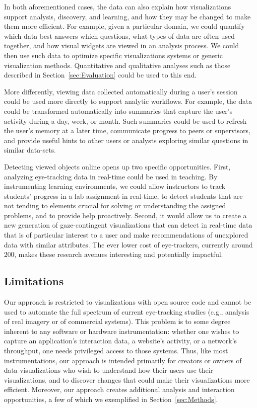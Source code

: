 In both aforementioned cases, the data can also explain how visualizations support analysis, discovery, and learning, and how they may be changed to make them more efficient. For example, given a particular domain, we could quantify which data best answers which questions, what types of data are often used together, and how visual widgets are viewed in an analysis process. We could then use such data to optimize specific visualizations systems or generic visualization methods.  Quantitative and qualitative analyses such as those described in Section~\ref{sec:Evaluation} could be used to this end.  

More differently, viewing data collected automatically during a user's session could be used more directly to support analytic workflows. For example, the data could be transformed automatically into summaries that capture the user's activity during a day, week, or month. Such summaries could be used to refresh the user's memory at a later time, communicate progress to peers or supervisors, and provide useful hints to other users or analysts exploring similar questions in similar data-sets.

Detecting viewed objects online opens up two specific opportunities. First, analyzing eye-tracking data in real-time could be used in teaching. By instrumenting learning environments, we could allow instructors to track students' progress in a lab assignment in real-time, to detect students that are not tending to elements crucial for solving or understanding the assigned problems, and to provide help proactively. Second, it would allow us to create a new generation of gaze-contingent visualizations that can detect in real-time data that is of particular interest to a user and make recommendations of unexplored data with similar attributes. The ever lower cost of eye-trackers, currently around $200$, makes these research avenues interesting and potentially impactful. 


\subsection{Limitations}
\label{sec:Limitations}
Our approach is restricted to visualizations with open source code and cannot be used to automate the full spectrum of current eye-tracking studies (e.g., analysis of real imagery or of commercial systems).   This problem is to some degree inherent to any software or hardware instrumentation: whether one wishes to capture an application's interaction data, a website's activity, or a network's throughput, one needs privileged access to those systems. Thus, like most instrumentations, our approach is intended primarily for creators or owners of data visualizations who wish to understand how their users use their visualizations, and to discover changes that could make their visualizations more efficient. Moreover, our approach creates additional analysis and interaction opportunities, a few of which we exemplified in Section~\ref{sec:Methods}. 

